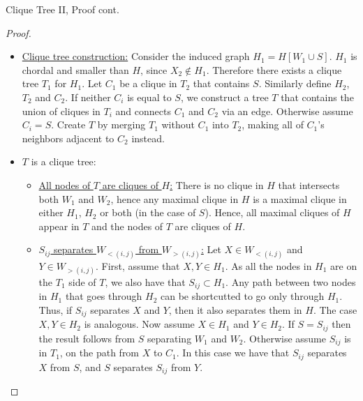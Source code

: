\begin{frame}{Clique Tree II, Proof cont.}
\begin{proof}
    \begin{itemize}
        \item \underline{Clique tree construction:}
Consider the induced graph $H_1 = H[W_1 \cup S]$.
\pause
$H_1$ is chordal and smaller than $H$, since $X_2 \notin H_1$.
\pause
Therefore there exists a clique tree $T_1$ for $H_1$.
\pause
Let $C_1$ be a clique in $T_2$ that contains $S$.
\pause
Similarly define $H_2$, $T_2$ and $C_2$.
\pause
If neither $C_i$ is equal to $S$, we construct a tree $T$ that contains the union of cliques in $T_i$ and connects $C_1$ and $C_2$ via an edge.
\pause
Otherwise assume $C_i = S$. Create $T$ by merging $T_1$ without $C_1$ into $T_2$, making all of $C_1$'s neighbors adjacent to $C_2$ instead.
\pause \item $T$ is a clique tree:
\pause
\begin{itemize} \item \underline{All nodes of $T$ are cliques of $H$:}
There is no clique in $H$ that intersects both $W_1$ and $W_2$, hence any maximal clique in $H$ is a maximal clique in either $H_1$, $H_2$ or both (in the case of $S$).
\pause
Hence, all maximal cliques of $H$ appear in $T$ and the nodes of $T$ are cliques of $H$.
\pause
\item \underline{$S_{ij}$ separates $W_{<(i,j)}$ from $W_{>(i,j)}$:}
\pause
Let $X \in W_{<(i,j)}$ and $Y \in W_{>(i,j)}$.
\pause
First, assume that $X,Y \in H_1$. As all the nodes in $H_1$ are on the $T_1$ side of $T$, we also have that $S_{ij} \subset H_1$.
\pause
Any path between two nodes in $H_1$ that goes through $H_2$ can be shortcutted to go only through $H_1$.
\pause
Thus, if $S_{ij}$ separates $X$ and $Y$, then it also separates them in $H$.
\pause
The case $X,Y \in H_2$ is analogous.
\pause
Now assume $X \in H_1$ and $Y \in H_2$.
\pause
If $S = S_{ij}$ then the result follows from $S$ separating $W_1$ and $W_2$.
\pause
Otherwise assume $S_{ij}$ is in $T_1$, on the path from $X$ to $C_1$.
In this case we have that $S_{ij}$ separates $X$ from $S$, and $S$ separates $S_{ij}$ from $Y$.
\end{itemize}
    \end{itemize}
\end{proof}
\end{frame}

